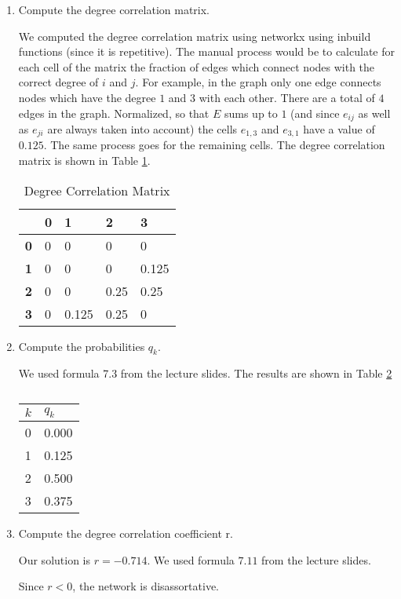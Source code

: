 

\begin{enumerate}
	\item Compute the degree correlation matrix.
	
	We computed the degree correlation matrix using networkx using inbuild functions (since it is repetitive).  The manual process would be to calculate for each cell of the matrix the fraction of edges which connect nodes with the correct degree of $i$ and $j$.  For example,  in the graph only one edge connects nodes which have the degree $1$ and $3$ with each other.  There are a total of $4$ edges in the graph.  Normalized, so that $E$ sums up to $1$ (and since $e_{ij}$ as well as $e_{ji}$ are always taken into account) the cells $e_{1,3}$ and $e_{3,1}$ have a value of $0.125$. The same process goes for the remaining cells. The degree correlation matrix is shown in Table \ref{tab:deg_corr_mat}.
	
	\begin{table}[h]
	\centering
	\begin{tabular}{lllll}
		\hline
		\textbf{}  & \textbf{0} & \textbf{1} & \textbf{2} & \textbf{3} \\ \hline
		\textbf{0} & 0          & 0          & 0          & 0          \\ \hline
		\textbf{1} & 0          & 0          & 0          & 0.125      \\ \hline
		\textbf{2} & 0          & 0          & 0.25       & 0.25       \\ \hline
		\textbf{3} & 0          & 0.125      & 0.25       & 0          \\ \hline
	\end{tabular}
	\caption{Degree Correlation Matrix}
	\label{tab:deg_corr_mat}
	\end{table}
	
	\item Compute the probabilities $q_k$.
	
	We used formula 7.3 from the lecture slides.  The results are shown in Table \ref{tab:qk}
	
	\begin{table}[h]
	\centering
	\begin{tabular}{|l|l|}
		\hline
		\textbf{$k$} & \textbf{$q_k$} \\ \hline
		0          & 0.000         \\ \hline
		1          & 0.125         \\ \hline
		2          & 0.500         \\ \hline
		3          & 0.375         \\ \hline
	\end{tabular}
	\caption{}
	\label{tab:qk}
	\end{table}

  \item Compute the degree correlation coefficient r.
  
  Our solution is $r = -0.714$. We used formula $7.11$ from the lecture slides. 
  
  Since $r < 0$, the network is disassortative.
\end{enumerate}